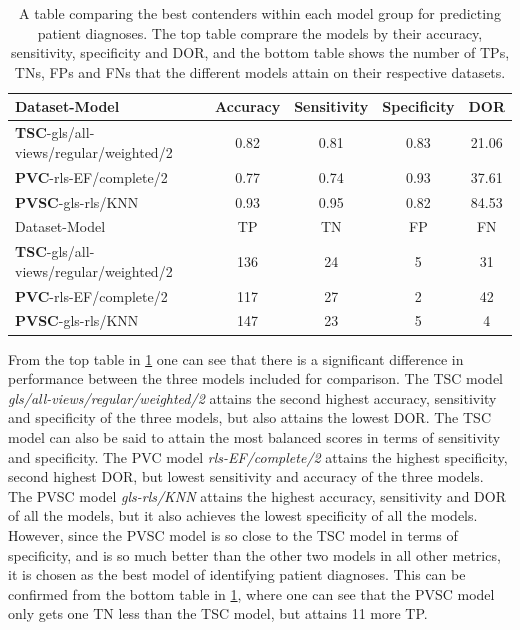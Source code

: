 \begin{table}
    \centering
    \begin{tabular}{lcccc}
        \toprule
        Dataset-Model                                 &  Accuracy &  Sensitivity &  Specificity &  DOR \\
        \midrule
        \textbf{TSC}-gls/all-views/regular/weighted/2 &      0.82 &         0.81 &         0.83 & 21.06 \\
        \textbf{PVC}-rls-EF/complete/2                &      0.77 &         0.74 &         0.93 & 37.61 \\
        \textbf{PVSC}-gls-rls/KNN                     &      0.93 &         0.95 &         0.82 & 84.53 \\
        \midrule
        Dataset-Model                                 &  TP &  TN &  FP &  FN \\
        \midrule
        \textbf{TSC}-gls/all-views/regular/weighted/2 & 136 &  24 &   5 &  31 \\
        \textbf{PVC}-rls-EF/complete/2                & 117 &  27 &   2 &  42 \\
        \textbf{PVSC}-gls-rls/KNN                     & 147 &  23 &  5  &   4 \\
        \bottomrule
    \end{tabular}
    \caption{A table comparing the best contenders within each model group for predicting patient diagnoses. 
             The top table comprare the models by their accuracy, sensitivity, specificity and DOR, 
             and the bottom table shows the number of TPs, TNs, FPs and FNs that the different models attain on their respective datasets.}
    \label{tab:pd_compare}
\end{table}

From the top table in \ref{tab:pd_compare} one can see that there is a significant difference in performance between the three models included for comparison.
The TSC model \textit{gls/all-views/regular/weighted/2} attains the second highest accuracy, sensitivity and specificity of the three models, but also attains the lowest DOR.
The TSC model can also be said to attain the most balanced scores in terms of sensitivity and specificity. 
The PVC model \textit{rls-EF/complete/2} attains the highest specificity, second highest DOR, but lowest sensitivity and accuracy of the three models. 
The PVSC model \textit{gls-rls/KNN} attains the highest accuracy, sensitivity and DOR of all the models, but it also achieves the lowest specificity of all the models. 
However, since the PVSC model is so close to the TSC model in terms of specificity, and is so much better than the other two models in all other metrics, it is chosen as the best model of 
identifying patient diagnoses.
This can be confirmed from the bottom table in \ref{tab:pd_compare}, where one can see that the PVSC model only gets one TN less than the TSC model, but attains 11 more TP.

